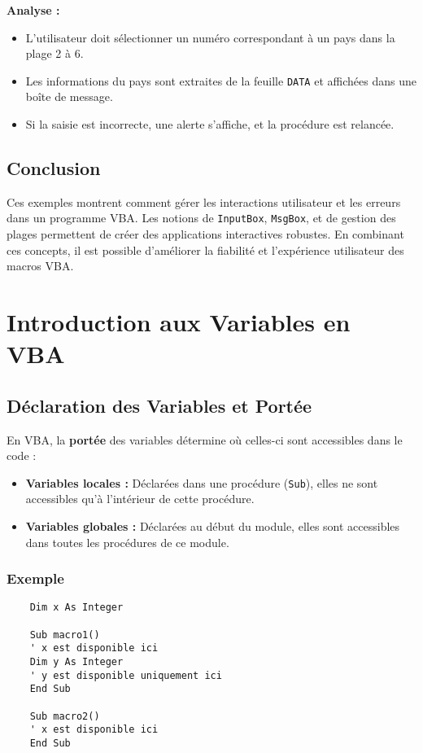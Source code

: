 \documentclass[a4paper,12pt]{report}
\begin{document}
\textbf{Analyse :}
\begin{itemize}
	\item L'utilisateur doit sélectionner un numéro correspondant à un pays dans la plage 2 à 6.
	\item Les informations du pays sont extraites de la feuille \texttt{DATA} et affichées dans une boîte de message.
	\item Si la saisie est incorrecte, une alerte s'affiche, et la procédure est relancée.
\end{itemize}

\section{Conclusion}

Ces exemples montrent comment gérer les interactions utilisateur et les erreurs dans un programme VBA. Les notions de \texttt{InputBox}, \texttt{MsgBox}, et de gestion des plages permettent de créer des applications interactives robustes. En combinant ces concepts, il est possible d'améliorer la fiabilité et l'expérience utilisateur des macros VBA.
	
\chapter{Introduction aux Variables en VBA}

\section{Déclaration des Variables et Portée}
En VBA, la \textbf{portée} des variables détermine où celles-ci sont accessibles dans le code :
\begin{itemize}
	\item \textbf{Variables locales :} Déclarées dans une procédure (\texttt{Sub}), elles ne sont accessibles qu'à l'intérieur de cette procédure.
	\item \textbf{Variables globales :} Déclarées au début du module, elles sont accessibles dans toutes les procédures de ce module.
\end{itemize}

\subsection*{Exemple}
\begin{lstlisting}
	Dim x As Integer
	
	Sub macro1()
	' x est disponible ici
	Dim y As Integer
	' y est disponible uniquement ici
	End Sub
	
	Sub macro2()
	' x est disponible ici
	End Sub
\end{lstlisting}
\end{document}
